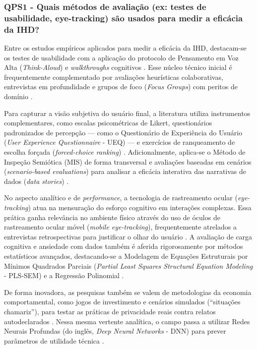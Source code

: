 \documentclass[
	12pt,				%
	oneside,			%
	a4paper,			%
	english,			%
	brazil				%
	]{abntex2ppgsi}
\begin{document}
   \subsubsection{QPS1 - Quais métodos de avaliação (ex: testes de usabilidade, eye-tracking) são usados para medir a eficácia da IHD?}

    Entre os estudos empíricos aplicados para medir a eficácia da IHD, destacam-se os testes de usabilidade com a aplicação do protocolo de Pensamento em Voz Alta (\textit{Think-Aloud}) \cite{Koesten2021, Victorelli2024Adopting, casado2022sonification} e \textit{walkthroughs} cognitivos \cite{Sailaja2021, chalhoub2024useful}. Esse núcleo técnico inicial é frequentemente complementado por avaliações heurísticas colaborativas, entrevistas em profundidade e grupos de foco (\textit{Focus Groups}) com peritos de domínio \cite{barcellos2022towards, DeKreij2024, Strey2019Human}.
    
    Para capturar a visão subjetiva do usuário final, a literatura utiliza instrumentos complementares, como escalas psicométricas de Likert, questionários padronizados de percepção — como o Questionário de Experiência do Usuário (\textit{User Experience Questionnaire} - UEQ) — e exercícios de ranqueamento de escolha forçada (\textit{forced-choice ranking}) \cite{Elhamdadi2022, Capeleti2024Human, cezar2023cognitive, kaufmann2021ethical}. Adicionalmente, aplica-se o Método de Inspeção Semiótica (MIS) de forma transversal e avaliações baseadas em cenários (\textit{scenario-based evaluations}) para analisar a eficácia interativa das narrativas de dados (\textit{data stories}) \cite{JoseViterbo2020, ferreira2024connecting, anciaux2019personal}.
    
     No aspecto analítico e de \textit{performance}, a tecnologia de rastreamento ocular (\textit{eye-tracking}) atua na mensuração do esforço cognitivo em interações complexas. Essa prática ganha relevância no ambiente físico através do uso de óculos de rastreamento ocular móvel (\textit{mobile eye-tracking}), frequentemente atrelados a entrevistas retrospectivas para justificar o olhar do usuário \cite{Capeleti2024Human, kaufmann2021ethical}. A avaliação de carga cognitiva e ansiedade com dados também é aferida rigorosamente por métodos estatísticos avançados, destacando-se a Modelagem de Equações Estruturais por Mínimos Quadrados Parciais (\textit{Partial Least Squares Structural Equation Modeling} - PLS-SEM) e a Regressão Polinomial \cite{mu2024institutional, cezar2023cognitive}.
     
    De forma inovadora, as pesquisas também se valem de metodologias da economia comportamental, como jogos de investimento \cite{Elhamdadi2022} e cenários simulados (``situações chamariz''), para testar as práticas de privacidade reais contra relatos autodeclarados \cite{Jones2017}. Nessa mesma vertente analítica, o campo passa a utilizar Redes Neurais Profundas (do inglês, \textit{Deep Neural Networks} - DNN) para prever parâmetros de utilidade técnica \cite{Koesten2021, coleti2024human}.
    
\end{document}
